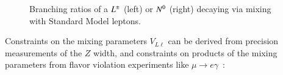 \begin{figure}[h]
  \centering
  \hfill
  \caption{Branching ratios of a $L^{\pm}$ (left) or $N^{0}$ (right) decaying via mixing with Standard Model leptons.}
  \label{fig:resonance-branching-ratios}
\end{figure}

Constraints on the mixing parameters $V_{L\ell}$ can be derived from precision measurements of the $Z$ width, and constraints on products of the mixing parameters from flavor violation experiments like $\mu\rightarrow e\gamma$~\cite{Abada:2008hr,Abada:2007kn,delAguila:2008cv,Altmannshofer:2014ej}:

